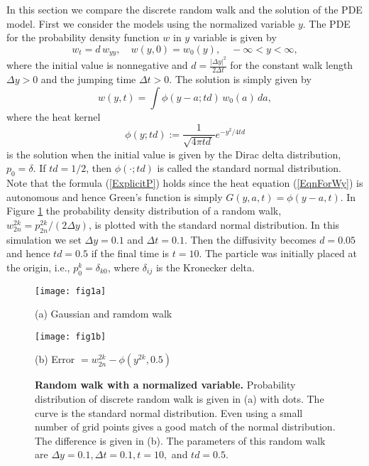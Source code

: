 \documentclass[11pt]{amsart}
\def\d{d}
\begin{document}
In this section we compare the discrete random walk and the solution of the PDE model. First we consider the models using the normalized variable $y$. The PDE for the probability density function $w$ in $y$ variable is given by
\begin{equation}\label{EqnForWy}
w_t=\d \,w_{yy},\quad w(y,0)=w_0(y),\quad -\infty<y<\infty,
\end{equation}
where the initial value is nonnegative and $\d=\frac{|\Delta y|^2}{2\Delta t}$ for the constant walk length $\Delta y>0$ and the jumping time $\Delta t>0$. The solution is simply given by
\begin{equation}\label{ExplicitP}
w(y,t) = \int \phi(y-a;t\d)\, w_0(a)\,da,
\end{equation}
where the heat kernel
\begin{equation*}
\phi(y;t\d):=\frac{1}{\sqrt{4\pi t\d\,}}e^{-y^2/4t\d}
\end{equation*}
is the solution when the initial value is given by the Dirac delta distribution, $p_0=\delta$. If $t\d=1/2$, then $\phi(\cdot;t\d)$ is called the standard normal distribution.  Note that the formula (\ref{ExplicitP}) holds since the heat equation (\ref{EqnForWy}) is autonomous and hence Green's function is simply $G(y,a,t)=\phi(y-a,t)$. In Figure \ref{fig1} the probability density distribution of a random walk, $w^{2k}_{2n}=p^{2k}_{2n}/(2\Delta y)$, is plotted with the standard normal distribution. In this simulation we set $\Delta y=0.1$ and $\Delta t=0.1$. Then the diffusivity becomes $\d=0.05$ and hence $t\d=0.5$ if the final time is $t=10$. The particle was initially placed at the origin, i.e., $p^k_0=\delta_{k0}$, where $\delta_{ij}$ is the Kronecker delta.

\begin{figure}[ht]
\centering
\begin{minipage}[t]{0.48\textwidth}
\centering
\texttt{[image: fig1a]}

(a) Gaussian and ramdom walk
\end{minipage}
\begin{minipage}[t]{0.48\textwidth}
 \centering
 \texttt{[image: fig1b]}

(b) Error $=w^{2k}_{2n}-\phi(y^{2k},0.5)$
\end{minipage}
 \caption{{\bf Random walk with a normalized variable.} Probability distribution of discrete random walk is given in (a) with dots. The curve is the standard normal distribution. Even using a small number of grid points gives a good match of the normal distribution. The difference is given in (b). The parameters of this random walk are $\Delta y=0.1,\Delta t=0.1,t=10,$ and $t\d=0.5$.} \label{fig1}
\end{figure}
\end{document}
